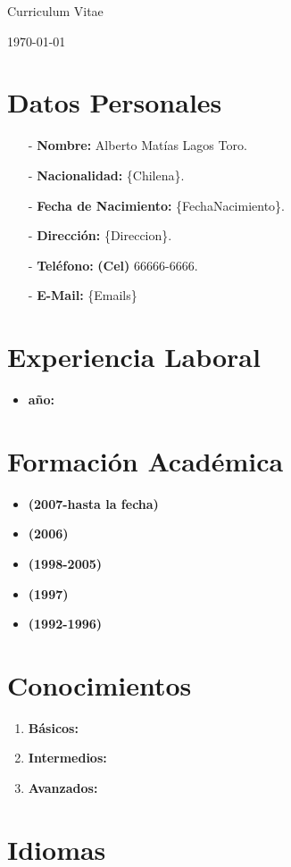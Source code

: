 \documentclass[a4paper]{article}
\begin{document}
	\begin{center}
		\huge{Curriculum Vitae} 
	\end{center}
	\begin{flushright}
		\today
	\end{flushright}
\section{Datos Personales} 
	\begin{itemize}
		\item[-] \textbf{Nombre:} Alberto Matías Lagos Toro.
		\item[-] \textbf{Nacionalidad: } \{Chilena\}.
		\item[-] \textbf{Fecha de Nacimiento:} \{FechaNacimiento\}.
		\item[-] \textbf{Dirección:} \{Direccion\}.
		\item[-] \textbf{Teléfono:} \textbf{(Cel)} 66666-6666.
		\item[-] \textbf{E-Mail:} \{Emails\}
	\end{itemize}
\section{Experiencia Laboral}
	\begin{itemize}
		\item \textbf{año:}
		\begin{itemize}
		\end{itemize}
	\end{itemize}
\section{Formación Académica}
	\begin{itemize}
			\item \textbf{(2007-hasta la fecha)} 
			\item \textbf{(2006)} 
			\item \textbf{(1998-2005)}
			\item \textbf{(1997)} 
			\item \textbf{(1992-1996)}
	\end{itemize}
\section{Conocimientos}
	\begin{enumerate} 
		\item \textbf{Básicos:} 
		\item \textbf{Intermedios:}
		\item \textbf{Avanzados:} 
	\end{enumerate}
\section{Idiomas}
	
\end{document}
